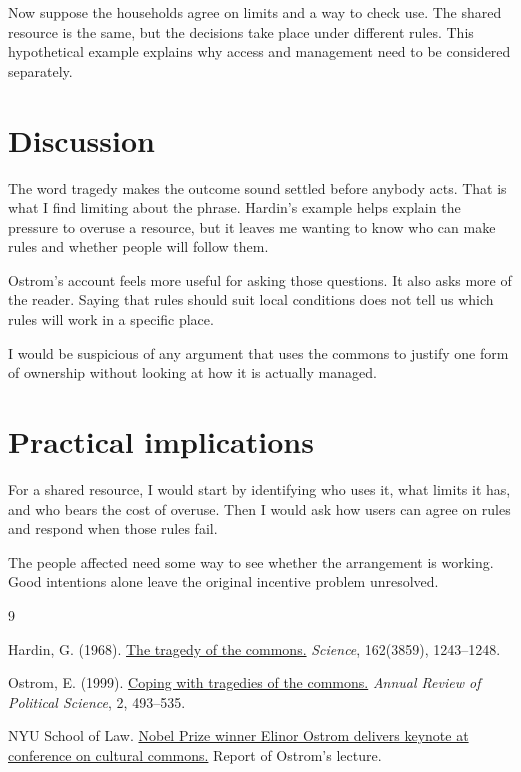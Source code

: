 \documentclass[11pt,a4paper]{article}
\begin{document}
Now suppose the households agree on limits and a way to check use.
The shared resource is the same, but the decisions take place under
different rules. This hypothetical example explains why access and
management need to be considered separately.

\section{Discussion}

The word tragedy makes the outcome sound settled before anybody acts.
That is what I find limiting about the phrase. Hardin's example helps
explain the pressure to overuse a resource, but it leaves me wanting to
know who can make rules and whether people will follow them.

Ostrom's account feels more useful for asking those questions. It also
asks more of the reader. Saying that rules should suit local conditions
does not tell us which rules will work in a specific place.

I would be suspicious of any argument that uses the commons to justify
one form of ownership without looking at how it is actually managed.

\section{Practical implications}

For a shared resource, I would start by identifying who uses it, what
limits it has, and who bears the cost of overuse. Then I would ask how
users can agree on rules and respond when those rules fail.

The people affected need some way to see whether the arrangement is
working. Good intentions alone leave the original incentive problem
unresolved.

\renewcommand{\refname}{References}
\begin{thebibliography}{9}
\small
\setlength{\itemsep}{0.35em}

Hardin, G. (1968).
\href{https://doi.org/10.1126/science.162.3859.1243}
{The tragedy of the commons.}
\textit{Science}, 162(3859), 1243--1248.

Ostrom, E. (1999).
\href{https://doi.org/10.1146/annurev.polisci.2.1.493}
{Coping with tragedies of the commons.}
\textit{Annual Review of Political Science}, 2, 493--535.

NYU School of Law.
\href{https://www.law.nyu.edu/news/OSTROM_CONFERENCE_KEYNOTE}
{Nobel Prize winner Elinor Ostrom delivers keynote at conference on cultural commons.}
Report of Ostrom's lecture.

\end{thebibliography}
\end{document}
